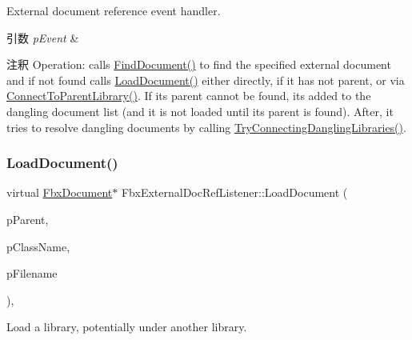 External document reference event handler. 
\begin{DoxyParams}{引数}
{\em p\+Event} & \\
\hline
\end{DoxyParams}
\begin{DoxyRemark}{注釈}
Operation\+: calls \hyperlink{class_fbx_external_doc_ref_listener_a945c6cf13ded5425201a557a66f18723}{Find\+Document()} to find the specified external document and if not found calls \hyperlink{class_fbx_external_doc_ref_listener_adeb34f3aa94412bf637b42f9ee6cf78b}{Load\+Document()} either directly, if it has not parent, or via \hyperlink{class_fbx_external_doc_ref_listener_a68443ac6cc93f33279eaac41e7b23d7f}{Connect\+To\+Parent\+Library()}. If its parent cannot be found, it\textquotesingle{}s added to the dangling document list (and it is not loaded until it\textquotesingle{}s parent is found). After, it tries to resolve dangling documents by calling \hyperlink{class_fbx_external_doc_ref_listener_a38eb0370ac40ed398430223cc2e9de5e}{Try\+Connecting\+Dangling\+Libraries()}. 
\end{DoxyRemark}
\mbox{\label{class_fbx_external_doc_ref_listener_adeb34f3aa94412bf637b42f9ee6cf78b}} 
\subsubsection{\texorpdfstring{Load\+Document()}{LoadDocument()}}
{\footnotesize\ttfamily virtual \hyperlink{class_fbx_document}{Fbx\+Document}$\ast$ Fbx\+External\+Doc\+Ref\+Listener\+::\+Load\+Document (\begin{DoxyParamCaption}\item[{\hyperlink{class_fbx_object}{Fbx\+Object} $\ast$}]{p\+Parent,  }\item[{const \hyperlink{class_fbx_string}{Fbx\+String} \&}]{p\+Class\+Name,  }\item[{const \hyperlink{class_fbx_string}{Fbx\+String} \&}]{p\+Filename }\end{DoxyParamCaption})\hspace{0.3cm}{\ttfamily [protected]}, {\ttfamily [virtual]}}



Load a library, potentially under another library. 

